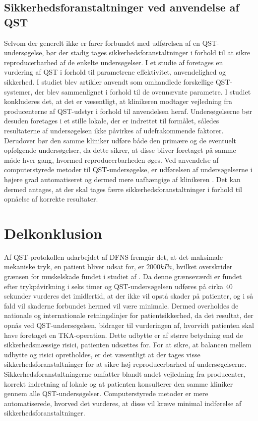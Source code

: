 \subsection{Sikkerhedsforanstaltninger ved anvendelse af QST}
Selvom der generelt ikke er farer forbundet med udførelsen af en QST-undersøgelse, bør der stadig tages sikkerhedsforanstaltninger i forhold til at sikre reproducerbarhed af de enkelte undersøgelser. I et studie af  foretages en vurdering af QST i forhold til parametrene effektivitet, anvendelighed og sikkerhed. I studiet blev artikler anvendt som omhandlede forskellige QST-systemer, der blev sammenlignet i forhold til de ovennævnte parametre. I studiet konkluderes det, at det er væsentligt, at klinikeren modtager vejledning fra producenterne af QST-udstyr i forhold til anvendelsen heraf. Undersøgelserne bør desuden foretages i et stille lokale, der er indrettet til formålet, således resultaterne af undersøgelsen ikke påvirkes af udefrakommende faktorer. Derudover bør den samme kliniker udføre både den primære og de eventuelt opfølgende undersøgelser, da dette sikrer, at disse bliver foretaget på samme måde hver gang, hvormed reproducerbarheden øges. \citep{shy2003}
Ved anvendelse af computerstyrede metoder til QST-undersøgelse, er udførelsen af undersøgelserne i højere grad automatiseret og dermed mere uafhængige af klinikeren \citep{Nielsen2015}. Det kan dermed antages, at der skal tages færre sikkerhedsforanstaltninger i forhold til opnåelse af korrekte resultater.  

\section{Delkonklusion}
Af QST-protokollen udarbejdet af DFNS fremgår det, at det maksimale mekaniske tryk, en patient bliver udsat for, er $2000 kPa$, hvilket overskrider grænsen for muskelskade fundet i studiet af . Da denne grænseværdi er fundet efter trykpåvirkning i seks timer og QST-undersøgelsen udføres på cirka 40 sekunder vurderes det imidlertid, at der ikke vil opstå skader på patienter, og i så fald vil skaderne forbundet hermed vil være minimale. Dermed overholdes de nationale og internationale retningslinjer for patientsikkerhed, da det resultat, der opnås ved QST-undersøgelsen, bidrager til vurderingen af, hvorvidt patienten skal have foretaget en TKA-operation. Dette udbytte er af større betydning end de sikkerhedsmæssige risici, patienten udsættes for.
For at sikre, at balancen mellem udbytte og risici opretholdes, er det væsentligt at der tages visse sikkerhedsforanstaltninger for at sikre høj reproducerbarhed af undersøgelserne. Sikkerhedsforanstaltningerne omfatter blandt andet vejledning fra producenter, korrekt indretning af lokale og at patienten konsulterer den samme kliniker gennem alle QST-undersøgelser. Computerstyrede metoder er mere automatiserede, hvorved det vurderes, at disse vil kræve minimal indførelse af sikkerhedsforanstaltninger.



